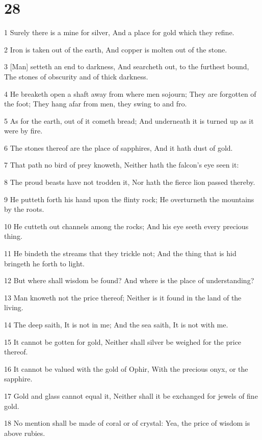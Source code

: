 \chapter{28}

\par 1 Surely there is a mine for silver, And a place for gold which they refine.
\par 2 Iron is taken out of the earth, And copper is molten out of the stone.
\par 3 [Man] setteth an end to darkness, And searcheth out, to the furthest bound, The stones of obscurity and of thick darkness.
\par 4 He breaketh open a shaft away from where men sojourn; They are forgotten of the foot; They hang afar from men, they swing to and fro.
\par 5 As for the earth, out of it cometh bread; And underneath it is turned up as it were by fire.
\par 6 The stones thereof are the place of sapphires, And it hath dust of gold.
\par 7 That path no bird of prey knoweth, Neither hath the falcon's eye seen it:
\par 8 The proud beasts have not trodden it, Nor hath the fierce lion passed thereby.
\par 9 He putteth forth his hand upon the flinty rock; He overturneth the mountains by the roots.
\par 10 He cutteth out channels among the rocks; And his eye seeth every precious thing.
\par 11 He bindeth the streams that they trickle not; And the thing that is hid bringeth he forth to light.
\par 12 But where shall wisdom be found? And where is the place of understanding?
\par 13 Man knoweth not the price thereof; Neither is it found in the land of the living.
\par 14 The deep saith, It is not in me; And the sea saith, It is not with me.
\par 15 It cannot be gotten for gold, Neither shall silver be weighed for the price thereof.
\par 16 It cannot be valued with the gold of Ophir, With the precious onyx, or the sapphire.
\par 17 Gold and glass cannot equal it, Neither shall it be exchanged for jewels of fine gold.
\par 18 No mention shall be made of coral or of crystal: Yea, the price of wisdom is above rubies.
